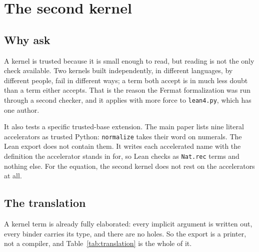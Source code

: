 \documentclass[11pt]{article}
\newcommand{\code}[1]{\texttt{#1}}
\begin{document}
\section{The second kernel}
\label{sec:lean}

\subsection{Why ask}

A kernel is trusted because it is small enough to read, but reading is not
the only check available. Two kernels built independently, in different
languages, by different people, fail in different ways; a term both accept is
in much less doubt than a term either accepts. That is the reason the Fermat
formalization was run through a second checker, and it applies with more
force to \code{lean4.py}, which has one author.

It also tests a specific trusted-base extension. The main paper lists nine
literal accelerators as trusted Python: \code{normalize} takes their word on
numerals. The Lean export does not contain them. It writes each accelerated
name with the definition the accelerator stands in for, so Lean checks
\leanAccelerated{} as \code{Nat.rec} terms and nothing else. For the
equation, the second kernel does not rest on the accelerators at all.

\subsection{The translation}
\label{sec:translation}

A kernel term is already fully elaborated: every implicit argument is written
out, every binder carries its type, and there are no holes. So the export is a
printer, not a compiler, and Table~\ref{tab:translation} is the whole of it.
\end{document}
